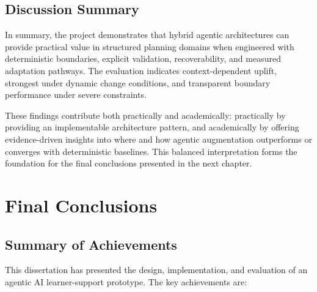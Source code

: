 \documentclass[12pt]{article}
\begin{document}
\subsection{Discussion Summary}
In summary, the project demonstrates that hybrid agentic architectures can provide practical value in structured planning domains when engineered with deterministic boundaries, explicit validation, recoverability, and measured adaptation pathways. The evaluation indicates context-dependent uplift, strongest under dynamic change conditions, and transparent boundary performance under severe constraints.

These findings contribute both practically and academically: practically by providing an implementable architecture pattern, and academically by offering evidence-driven insights into where and how agentic augmentation outperforms or converges with deterministic baselines. This balanced interpretation forms the foundation for the final conclusions presented in the next chapter.

\section{Final Conclusions}
\label{sec:conclusions}

\subsection{Summary of Achievements}

This dissertation has presented the design, implementation, and evaluation of an agentic AI learner-support prototype. The key achievements are:
\end{document}
